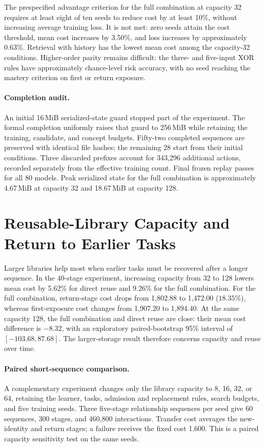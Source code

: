 The prespecified advantage criterion for the full combination at capacity 32
requires at least eight of ten seeds to reduce cost by at least 10\%, without
increasing average training loss. It is not met: zero seeds attain the cost
threshold, mean cost increases by 3.50\%, and loss increases by approximately
0.63\%. Retrieval with history has the lowest mean cost among the capacity-32
conditions. Higher-order parity remains difficult: the three- and five-input
XOR rules have approximately chance-level risk accuracy, with no seed reaching
the mastery criterion on first or return exposure.

\paragraph{Completion audit.}
An initial 16\,MiB serialized-state guard stopped part of the experiment.
The formal completion uniformly raises that guard to 256\,MiB while retaining
the training, candidate, and concept budgets. Fifty-two completed sequences
are preserved with identical file hashes; the remaining 28 start from their
initial conditions. Three discarded prefixes account for 343,296 additional
actions, recorded separately from the effective training count. Final frozen
replay passes for all 80 models. Peak serialized state for the full combination
is approximately 4.67\,MiB at capacity 32 and 18.67\,MiB at capacity 128.

\section{Reusable-Library Capacity and Return to Earlier Tasks}
\label{app:revision_capacity}

Larger libraries help most when earlier tasks must be recovered after a longer
sequence. In the 40-stage experiment, increasing capacity from 32 to 128 lowers
mean cost by 5.62\% for direct reuse and 9.26\% for the full combination.
For the full combination, return-stage cost drops from 1,802.88 to 1,472.00
($18.35\%$), whereas first-exposure cost changes from 1,907.20 to 1,894.40.
At the same capacity 128, the full combination and direct reuse are close:
their mean cost difference is $-8.32$, with an exploratory paired-bootstrap
95\% interval of $[-103.68,87.68]$. The larger-storage result therefore concerns
capacity and reuse over time.

\paragraph{Paired short-sequence comparison.}
A complementary experiment changes only the library capacity to 8, 16, 32, or
64, retaining the learner, tasks, admission and replacement rules, search
budgets, and five training seeds. Three five-stage relationship sequences per
seed give 60 sequences, 300 stages, and 460,800 interactions. Transfer cost
averages the new-identity and return stages; a failure receives the fixed cost
1,600. This is a paired capacity sensitivity test on the same seeds.

